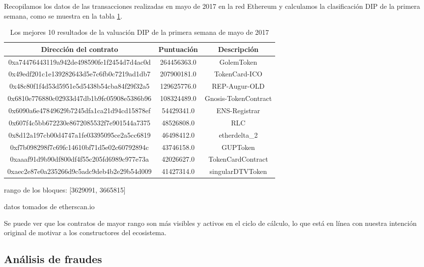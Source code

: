 Recopilamos los datos de las transacciones realizadas en mayo de 2017 en la red Ethereum y calculamos la clasificación DIP de la primera semana, como se muestra en la tabla \ref{table:dip}.

\begin{table}[h]
\centering
\begin{threeparttable}[b]
\caption{Los mejores 10 resultados de la valuación DIP de la primera semana de mayo de 2017}
\label{table:dip}
\begin{tabular}{ccc} \toprule
    {Dirección del contrato} & {Puntuación} & {Descripción\tnote{2}} \\ \midrule
0xa74476443119a942de498590fe1f2454d7d4ac0d & 264456363.0 & GolemToken \\
0x49edf201c1e139282643d5e7c6fb0c7219ad1db7 & 207900181.0 & TokenCard-ICO \\
0x48c80f1f4d53d5951e5d5438b54cba84f29f32a5 & 129625776.0 & REP-Augur-OLD \\
0x6810e776880c02933d47db1b9fc05908e5386b96 & 108324489.0 & Gnosis-TokenContract \\
0x6090a6e47849629b7245dfa1ca21d94cd15878ef & 54429341.0 & ENS-Registrar \\
0x607f4c5bb672230e8672085532f7e901544a7375 & 48526808.0 & RLC \\
0x8d12a197cb00d4747a1fe03395095ce2a5cc6819 & 46498412.0 & etherdelta\_2 \\
0xf7b098298f7c69fc14610bf71d5e02c60792894c & 43746158.0 & GUPToken \\
0xaaaf91d9b90df800df4f55c205fd6989c977e73a & 42026627.0 & TokenCardContract \\
0xaec2e87e0a235266d9c5adc9deb4b2e29b54d009 & 41427314.0 & singularDTVToken \\
\bottomrule
\end{tabular}
\begin{tablenotes}
  \small
  \item[1] rango de los bloques: [3629091, 3665815]
  \item[2] datos tomados de etherscan.io
\end{tablenotes}
\end{threeparttable}
\end{table}

Se puede ver que los contratos de mayor rango son más visibles y activos en el ciclo de cálculo, lo que está en línea con nuestra intención original de motivar a los constructores del ecosistema.

\subsection{Análisis de fraudes}
\label{dip:sybil}

